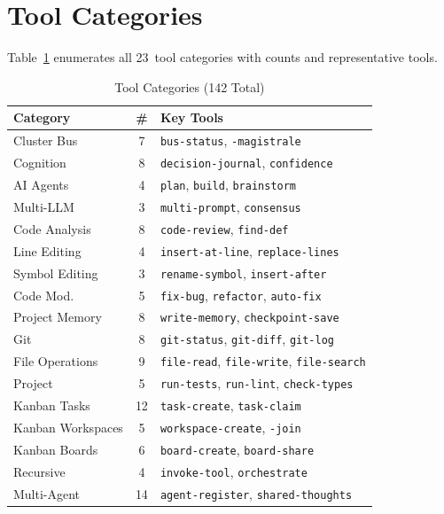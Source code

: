 \documentclass[journal,10pt]{IEEEtran}
\newcommand{\code}[1]{\texttt{#1}}
\begin{document}
\section{Tool Categories}
\label{sec:tools}

Table~\ref{tab:tools} enumerates all 23~tool categories with counts and representative tools.

\begin{table}[!t]
\centering
\caption{Tool Categories (142 Total)}
\label{tab:tools}
\renewcommand{\arraystretch}{0.95}
\begin{tabular}{@{}lcp{28mm}@{}}
\toprule
\textbf{Category} & \textbf{\#} & \textbf{Key Tools} \\
\midrule
Cluster Bus       & 7  & \code{bus-status}, \code{-magistrale} \\
Cognition         & 8  & \code{decision-journal}, \code{confidence} \\
AI Agents         & 4  & \code{plan}, \code{build}, \code{brainstorm} \\
Multi-LLM         & 3  & \code{multi-prompt}, \code{consensus} \\
Code Analysis     & 8  & \code{code-review}, \code{find-def} \\
Line Editing      & 4  & \code{insert-at-line}, \code{replace-lines} \\
Symbol Editing    & 3  & \code{rename-symbol}, \code{insert-after} \\
Code Mod.         & 5  & \code{fix-bug}, \code{refactor}, \code{auto-fix} \\
Project Memory    & 8  & \code{write-memory}, \code{checkpoint-save} \\
Git               & 8  & \code{git-status}, \code{git-diff}, \code{git-log} \\
File Operations   & 9  & \code{file-read}, \code{file-write}, \code{file-search} \\
Project           & 5  & \code{run-tests}, \code{run-lint}, \code{check-types} \\
Kanban Tasks      & 12 & \code{task-create}, \code{task-claim} \\
Kanban Workspaces & 5  & \code{workspace-create}, \code{-join} \\
Kanban Boards     & 6  & \code{board-create}, \code{board-share} \\
Recursive         & 4  & \code{invoke-tool}, \code{orchestrate} \\
Multi-Agent       & 14 & \code{agent-register}, \code{shared-thoughts} \\

\end{tabular}
\end{table}
\end{document}
